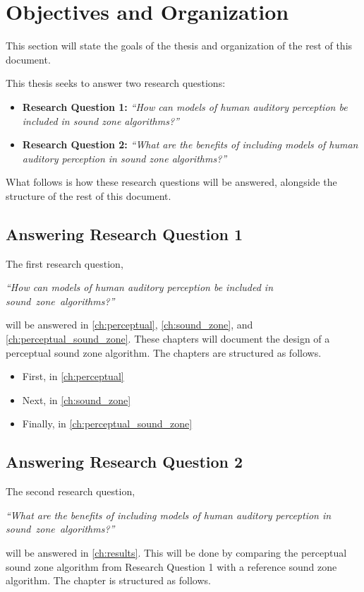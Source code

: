 \section{Objectives and Organization}
\label{ch:introduction:objectives}
This section will state the goals of the thesis and organization of the rest of this document.

This thesis seeks to answer two research questions:
\begin{itemize}
    \item \textbf{Research Question 1:} {\textit{``How can models of human auditory perception be included in sound zone algorithms?''}}
    \item \textbf{Research Question 2:} {\textit{``What are the benefits of including models of human auditory perception in sound zone algorithms?''}}
\end{itemize}

What follows is how these research questions will be answered, alongside the structure of the rest of this document.

\subsection{Answering Research Question 1}
The first research question, 

\begin{center}
    {\textit{``How can models of human auditory perception be included in sound~zone~algorithms?''}}
\end{center}

will be answered in \autoref{ch:perceptual}, \autoref{ch:sound_zone}, and \autoref{ch:perceptual_sound_zone}.
These chapters will document the design of a perceptual sound zone algorithm.
The chapters are structured as follows.
\begin{itemize}
    \item First, in \autoref{ch:perceptual}
    \item Next, in \autoref{ch:sound_zone}
    \item Finally, in \autoref{ch:perceptual_sound_zone}
\end{itemize}

\subsection{Answering Research Question 2}
The second research question, 

\begin{center}
    {\textit{``What are the benefits of including models of human auditory perception in sound~zone~algorithms?''}}
\end{center}

will be answered in \autoref{ch:results}.
This will be done by comparing the perceptual sound zone algorithm from Research Question 1 with a reference sound zone algorithm.
The chapter is structured as follows.


